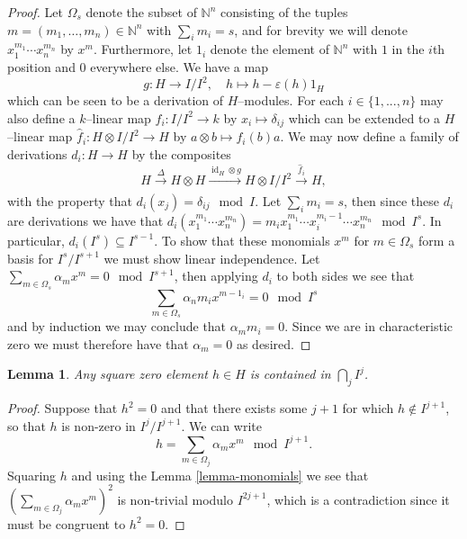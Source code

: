 \documentclass{article}
\theoremstyle{plain}
\newtheorem{Lemma}[Th]{Lemma}
\theoremstyle{definition}
\DeclareMathOperator{\id}{id}
\begin{document}
\begin{proof}
Let $\Omega_s$ denote the subset of $\mathbb{N}^n$ consisting of the tuples $m=(m_1, \dots, m_n)\in \mathbb{N}^n$ with $\sum_i m_i=s$, and for brevity we will denote $x_1^{m_1}\cdots x_n^{m_n}$ by $x^m$. Furthermore, let $1_i$ denote the element of $\mathbb{N}^n$ with $1$ in the $i$th position and $0$ everywhere else. We have a map 
\[
g\colon  H\to I/I^2, \quad h\mapsto h-\varepsilon(h)1_H
\]
which can be seen to be a derivation of $H$--modules. For each $i\in\{1, ..., n\}$  may also define a $k$--linear map $f_i\colon  I/I^2\to k$ by $x_i \mapsto \delta_{ij}$ which can be extended to a $H$--linear map $\hat{f}_i: H\otimes I/I^2 \to H$ by $a\otimes b \mapsto f_i(b)a$. We may now define a family of derivations $d_i:H\to H$ by the composites 
\[
H\xrightarrow[]{\Delta}H\otimes H \xrightarrow[]{\id_H\otimes g} H\otimes I/I^2 \xrightarrow[]{\hat{f}_i} H,
\]
with the property that $d_i(x_j)=\delta_{ij}\mod I$. Let $\sum_i m_i=s$, then since these $d_i$ are derivations we have that $d_i(x_1^{m_1}\cdots x_n^{m_n})=m_ix_1^{m_1}\cdots x_i^{m_i-1}\cdots x_n^{m_n} \mod I^s$. In particular, $d_i(I^s) \subseteq I^{s-1}$. To show that these monomials $x^m$ for $m\in \Omega_s$ form a basis for $I^s/I^{s+1}$ we must show linear independence. Let $\sum_{m\in \Omega_s} \alpha_m x^m =0 \mod I^{s+1}$, then applying $d_i$ to both sides we see that 
\[
\sum_{m\in \Omega_s} \alpha_n m_i x^{m-1_i}=0 \mod I^s
\]
 and by induction we may conclude that $\alpha_mm_i=0$. Since we are in characteristic zero we must therefore have that $\alpha_m=0$ as desired.
\end{proof}

\begin{Lemma}
    Any square zero element $h\in H$ is contained in $\bigcap_j I^j$.
\end{Lemma}

\begin{proof}
    Suppose that $h^2=0$ and that there exists some $j+1$ for which $h\notin I^{j+1}$, so that $h$ is non-zero in $I^{j}/I^{j+1}$. We can write 
    \[
    h=\sum_{m\in \Omega_{j}}\alpha_m x^m \mod I^{j+1}.
    \]
    Squaring $h$ and using the Lemma \ref{lemma-monomials} we see that $(\sum_{m\in \Omega_{j}}\alpha_m x^m)^2$ is non-trivial modulo $I^{2j+1}$, which is a contradiction since it must be congruent to $h^2=0$.
\end{proof}
\end{document}
